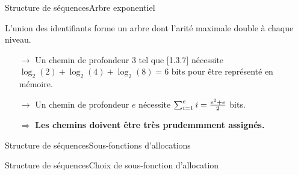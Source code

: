 \begin{frame}{Structure de séquences}{Arbre exponentiel}

  \begin{center}
    
  \end{center}

  L'union des identifiants forme un arbre dont l'arité maximale double à chaque
  niveau.
  
  \begin{itemize}
  \item [$\rightarrow$] Un chemin de profondeur 3 tel que [1.3.7] nécessite
    $\log_2(2)+\log_2(4)+\log_2(8)=6$ bits pour être représenté en mémoire.
  \item [$\rightarrow$] Un chemin de profondeur $e$ nécessite
    $\sum_{i=1}^e i = {e^2 + e \over 2}$ bits.
  \end{itemize}

  \vspace{0.25cm}
  \large
  \begin{itemize}
  \item [$\Rightarrow$] \textbf{Les chemins doivent être très prudemmment assignés.}
  \end{itemize}
    

\end{frame}


\begin{frame}{Structure de séquences}{Sous-fonctions d'allocations}
  
  \begin{minipage}{0.45\textwidth}
    \begin{center}
      
    \end{center}
  \end{minipage}
  \hfill
  \begin{minipage}{0.45\textwidth}
    \begin{center}
      
    \end{center}
  \end{minipage}

\end{frame}


\begin{frame}{Structure de séquences}{Choix de sous-fonction d'allocation}

\end{frame}

